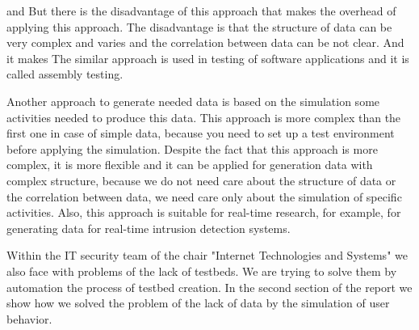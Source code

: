  and   But there is the disadvantage of this approach that makes the overhead of applying this approach. The disadvantage is that the structure of data can be very complex and varies and the correlation between data can be not clear. And it makes  The similar approach is used in testing of software applications and it is called assembly testing. 

Another approach to generate needed data is based on the simulation some activities needed to produce this data. This approach is more complex than the first one in case of simple data, because you need to set up a test environment before applying the simulation. Despite the fact that this approach is more complex, it is more flexible and it can be applied for generation data with complex structure, because we do not need care about the structure of data or the correlation between data, we need care only about the simulation of specific activities. Also, this approach is suitable for real-time research, for example, for generating data for real-time intrusion detection systems. 

 

Within the IT security team of the chair "Internet Technologies and Systems" we also face with problems of the lack of testbeds. We are trying to solve them by automation the process of testbed creation. In the second section of the report we show how we solved the problem of the lack of data by the simulation of user behavior.



